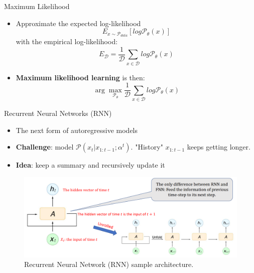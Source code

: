 \begin{frame}{Maximum Likelihood}
\begin{itemize}
    \item Approximate the expected log-likelihood
    $$ E_{x \sim \mathcal{P}_{data}} [log \mathcal{P}_{\theta}(x)]$$
    with the empirical log-likelihood:
    $$E_{\mathcal{D}} = \frac{1}{\mathcal{D}} \sum_{x \in \mathcal{D}} log \mathcal{P}_{\theta}(x)$$
    \item \textbf{Maximum likelihood learning} is then:
        $$\arg\max_{\mathcal{P}_{\theta}} \frac{1}{\mathcal{D}} \sum_{x \in \mathcal{D}} log \mathcal{P}_{\theta}(x)$$
\end{itemize}
\end{frame}

\begin{frame}[allowframebreaks]{Recurrent Neural Networks (RNN)}
\begin{itemize}
    \item The next form of autoregressive models
    \item \textbf{Challenge}: model $\mathcal{P}(x_t|x_{1:t-1}; \alpha^t)$. "History" $x_{1:t-1}$ keeps getting longer.
    \item \textbf{Idea}:  keep a summary and recursively update it
    \end{itemize}

\framebreak
\begin{figure}
    \centering
    \includegraphics[height=0.9\textheight, width=\textwidth, keepaspectratio]{images/arm/rnn_2.png}
    \caption{Recurrent Neural Network (RNN) sample architecture.}
\end{figure}


\end{frame}
